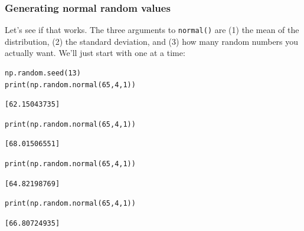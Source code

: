 \subsubsection{Generating normal random values}


Let's see if that works. The three arguments to \texttt{normal()} are (1) the
mean of the distribution, (2) the standard deviation, and (3) how many random
numbers you actually want. We'll just start with one at a time:

\begin{Verbatim}[fontsize=\small,samepage=true,frame=single,framesep=3mm]
np.random.seed(13)
print(np.random.normal(65,4,1))
\end{Verbatim}
\vspace{-.2in}

\begin{Verbatim}[fontsize=\small,samepage=true,frame=leftline,framesep=5mm,framerule=1mm]
[62.15043735]
\end{Verbatim}

\begin{Verbatim}[fontsize=\small,samepage=true,frame=single,framesep=3mm]
print(np.random.normal(65,4,1))
\end{Verbatim}
\vspace{-.2in}

\begin{Verbatim}[fontsize=\small,samepage=true,frame=leftline,framesep=5mm,framerule=1mm]
[68.01506551]
\end{Verbatim}

\begin{Verbatim}[fontsize=\small,samepage=true,frame=single,framesep=3mm]
print(np.random.normal(65,4,1))
\end{Verbatim}
\vspace{-.2in}

\begin{Verbatim}[fontsize=\small,samepage=true,frame=leftline,framesep=5mm,framerule=1mm]
[64.82198769]
\end{Verbatim}

\begin{Verbatim}[fontsize=\small,samepage=true,frame=single,framesep=3mm]
print(np.random.normal(65,4,1))
\end{Verbatim}
\vspace{-.2in}

\begin{Verbatim}[fontsize=\small,samepage=true,frame=leftline,framesep=5mm,framerule=1mm]
[66.80724935]
\end{Verbatim}

